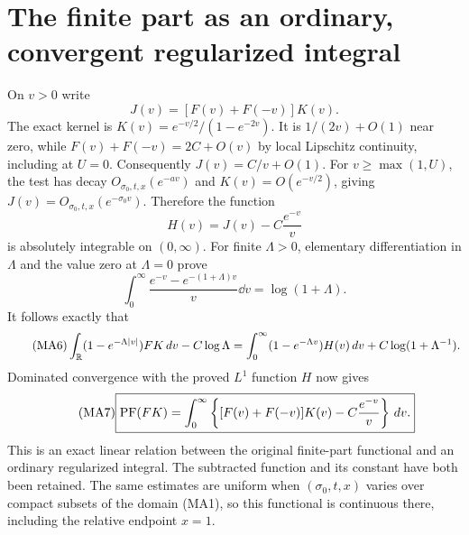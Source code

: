 \section{The finite part as an ordinary, convergent regularized integral}
On $v>0$ write
\[
 J(v)=[F(v)+F(-v)]K(v).
\]
The exact kernel is $K(v)=e^{-v/2}/(1-e^{-2v})$.
It is $1/(2v)+O(1)$ near zero, while
$F(v)+F(-v)=2C+O(v)$ by local Lipschitz continuity, including at $U=0$.
Consequently $J(v)=C/v+O(1)$. For $v\ge\max(1,U)$, the test has decay
$O_{\sigma_0,t,x}(e^{-av})$ and $K(v)=O(e^{-v/2})$, giving
$J(v)=O_{\sigma_0,t,x}(e^{-\sigma_0v})$.
Therefore the function
\begin{equation}\tag{MA5}
 H(v)=J(v)-C\frac{e^{-v}}v
\end{equation}
is absolutely integrable on $(0,\infty)$.
For finite $\Lambda>0$, elementary differentiation in $\Lambda$ and the
value zero at $\Lambda=0$ prove
\[
 \int_0^\infty\frac{e^{-v}-e^{-(1+\Lambda)v}}v\dd v=\log(1+\Lambda).
\]
It follows exactly that
\begin{equation}\tag{MA6}
 \int_\mathbb R(1-e^{-\Lambda|v|})FK\,d v-C\log\Lambda
 =\int_0^\infty(1-e^{-\Lambda v})H(v)\,d v
  +C\log(1+\Lambda^{-1}).
\end{equation}
Dominated convergence with the proved $L^1$ function $H$ now gives
\begin{equation}\tag{MA7}
 \boxed{\operatorname{PF}(FK)=\int_0^\infty
 \left\{[F(v)+F(-v)]K(v)-C\frac{e^{-v}}v\right\}\,d v.}
\end{equation}
This is an exact linear relation between the original finite-part functional
and an ordinary regularized integral. The subtracted function and its
constant have both been retained. The same estimates are uniform when
$(\sigma_0,t,x)$ varies over compact subsets of the domain (MA1), so this
functional is continuous there, including the relative endpoint $x=1$.

